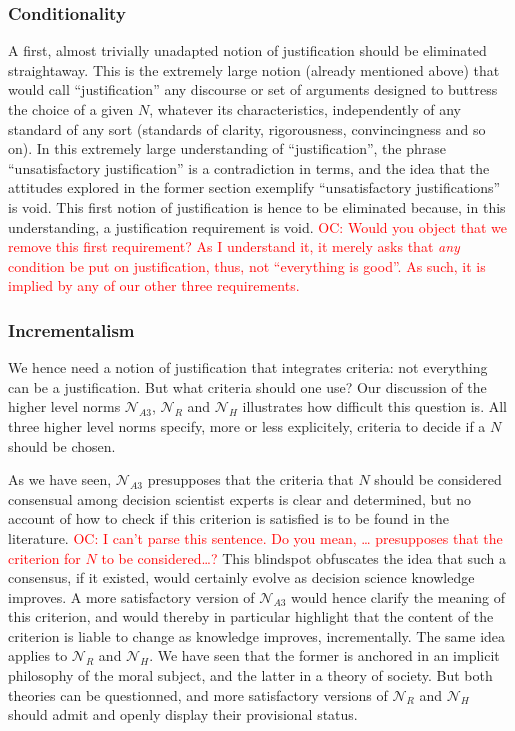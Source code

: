 \documentclass[preprint, french, english, 11pt, authoryear]{elsarticle}%
\newcommand{\commentOC}[1]{\textcolor{red}{OC: #1}}
\begin{document}
\subsubsection{Conditionality}
A first, almost trivially unadapted notion of justification should be eliminated straightaway. This is the extremely large notion (already mentioned above) that would call ``justification'' any discourse or set of arguments designed to buttress the choice of a given $N$, whatever its characteristics, independently of any standard of any sort (standards of clarity, rigorousness, convincingness and so on). In this extremely large understanding of ``justification'', the phrase ``unsatisfactory justification'' is a contradiction in terms, and the idea that the attitudes explored in the former section exemplify ``unsatisfactory justifications'' is void. This first notion of justification is hence to be eliminated because, in this understanding, a justification requirement is void.
\commentOC{Would you object that we remove this first requirement? As I understand it, it merely asks that \emph{any} condition be put on justification, thus, not “everything is good”. As such, it is implied by any of our other three requirements.}

\subsubsection{Incrementalism}
We hence need a notion of justification that integrates criteria: not everything can be a justification. But what criteria should one use? Our discussion of the higher level norms $\mathscr{N}_{A3}$, $\mathscr{N}_{R}$ and $\mathscr{N}_{H}$ illustrates how difficult this question is. All three higher level norms specify, more or less explicitely, criteria to decide if a $N$ should be chosen.

As we have seen, $\mathscr{N}_{A3}$ presupposes that the criteria that $N$ should be considered consensual among decision scientist experts is clear and determined, but no account of how to check if this criterion is satisfied is to be found in the literature. 
\commentOC{I can’t parse this sentence. Do you mean, … presupposes that the criterion for $N$ to be considered…?}
This blindspot obfuscates the idea that such a consensus, if it existed, would certainly evolve as decision science knowledge improves. A more satisfactory version of $\mathscr{N}_{A3}$ would hence clarify the meaning of this criterion, and would thereby in particular highlight that the content of the criterion is liable to change as knowledge improves, incrementally. The same idea applies to $\mathscr{N}_{R}$ and $\mathscr{N}_{H}$. We have seen that the former is anchored in an implicit philosophy of the moral subject, and the latter in a theory of society. But both theories can be questionned, and more satisfactory versions of $\mathscr{N}_{R}$ and $\mathscr{N}_{H}$ should admit and openly display their provisional status.
\end{document}
